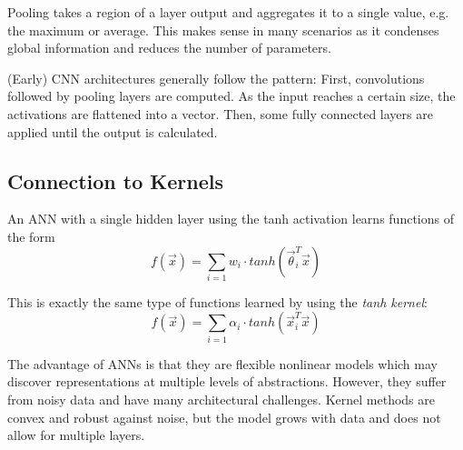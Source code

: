Pooling takes a region of a layer output
and aggregates it to a single value,
e.g. the maximum or average.
This makes sense in many scenarios as it condenses
global information and reduces the number of parameters.

(Early) CNN architectures generally follow the pattern:
First, convolutions followed by pooling layers are computed.
As the input reaches a certain size,
the activations are flattened into a vector.
Then, some fully connected layers are applied until the
output is calculated.


\subsection{Connection to Kernels}

An ANN with a single hidden layer using the tanh activation
learns functions of the form
\begin{equation*}
f(\vec{x}) = \sum_{i=1}{w_i \cdot tanh(\vec{\theta}_i^T \vec{x})}
\end{equation*}

This is exactly the same type of functions learned by using the
\emph{tanh kernel}:
\begin{equation*}
f(\vec{x}) = \sum_{i=1}{\alpha_i \cdot tanh(
	\vec{x}_i^T \vec{x}
	)}
\end{equation*}

The advantage of ANNs is that they are flexible nonlinear
models which may discover representations at multiple
levels of abstractions.
However, they suffer from noisy data and have many
architectural challenges.
Kernel methods are convex and robust against noise,
but the model grows with data and does not allow
for multiple layers.
